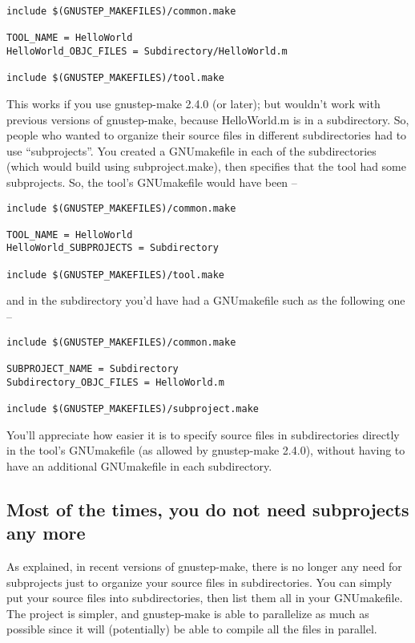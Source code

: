 \documentclass[a4paper]{article}
\begin{document}
\begin{verbatim}
include $(GNUSTEP_MAKEFILES)/common.make

TOOL_NAME = HelloWorld
HelloWorld_OBJC_FILES = Subdirectory/HelloWorld.m

include $(GNUSTEP_MAKEFILES)/tool.make
\end{verbatim}

This works if you use gnustep-make 2.4.0 (or later); but wouldn't work
with previous versions of gnustep-make, because HelloWorld.m is in a
subdirectory.  So, people who wanted to organize their source files in
different subdirectories had to use ``subprojects''.  You created a
GNUmakefile in each of the subdirectories (which would build using
subproject.make), then specifies that the tool had some subprojects.
So, the tool's GNUmakefile would have been --

\begin{verbatim}
include $(GNUSTEP_MAKEFILES)/common.make

TOOL_NAME = HelloWorld
HelloWorld_SUBPROJECTS = Subdirectory

include $(GNUSTEP_MAKEFILES)/tool.make
\end{verbatim}

and in the subdirectory you'd have had a GNUmakefile such as the
following one --

\begin{verbatim}
include $(GNUSTEP_MAKEFILES)/common.make

SUBPROJECT_NAME = Subdirectory
Subdirectory_OBJC_FILES = HelloWorld.m

include $(GNUSTEP_MAKEFILES)/subproject.make
\end{verbatim}

You'll appreciate how easier it is to specify source files in
subdirectories directly in the tool's GNUmakefile (as allowed by
gnustep-make 2.4.0), without having to have an additional GNUmakefile
in each subdirectory.

\subsection{Most of the times, you do not need subprojects any more}
As explained, in recent versions of gnustep-make, there is no longer
any need for subprojects just to organize your source files in
subdirectories.  You can simply put your source files into
subdirectories, then list them all in your GNUmakefile.  The project
is simpler, and gnustep-make is able to parallelize as much as
possible since it will (potentially) be able to compile all the files
in parallel.
\end{document}

